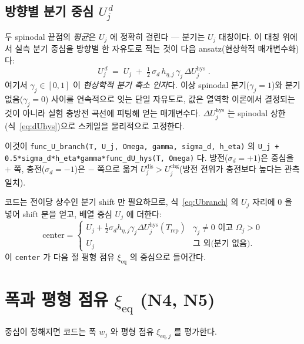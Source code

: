\documentclass[11pt,a4paper]{article}
\newcommand{\eq}{\mathrm{eq}}
\newcommand{\dis}{\mathrm{dis}}
\newcommand{\chg}{\mathrm{chg}}
\newcommand{\hys}{\mathrm{hys}}
\newcommand{\rep}{\mathrm{rep}}
\newcommand{\code}[1]{\texttt{#1}}
\begin{document}
\subsection{방향별 분기 중심 $U_j^{\,d}$}
두 spinodal 끝점의 \emph{평균}은 $U_j$ 에 정확히 걸린다 — 분기는 $U_j$ 대칭이다. 이 대칭 위에서 실측 분기 중심을
방향별 한 자유도로 적는 것이 다음 ansatz(현상학적 매개변수화)다:
\begin{equation}
\boxed{\;U_j^{\,d}\;=\;U_j\;+\;\tfrac12\,\sigma_d\,h_{\eta,j}\,\gamma_j\,\Delta U_j^\hys\;.}
\label{eq:Ubranch}
\end{equation}
여기서 $\gamma_j\in[0,1]$ 이 \emph{현상학적 분기 축소 인자}다. 이상 spinodal 분기($\gamma_j=1$)와 분기 없음($\gamma_j=0$) 사이를 연속적으로 잇는 단일 자유도로, 값은 열역학 이론에서 결정되는 것이 아니라 실험 충방전 곡선에 피팅해 얻는 매개변수다. $\Delta U_j^\hys$ 는 spinodal 상한(식~\eqref{eq:dUhys})으로 스케일을 물리적으로 고정한다.

이것이 \code{func\_U\_branch(T, U\_j, Omega, gamma, sigma\_d, h\_eta)} 의
\code{U\_j + 0.5*sigma\_d*h\_eta*gamma*func\_dU\_hys(T, Omega)} 다. 방전($\sigma_d=+1$)은 중심을 $+$ 쪽,
충전($\sigma_d=-1$)은 $-$ 쪽으로 옮겨 $U_j^{\dis}>U_j^{\chg}$(방전 전위가 충전보다 높다는 관측 일치).

코드는 전이당 상수인 분기 shift 만 필요하므로, 식~\eqref{eq:Ubranch} 의 $U_j$ 자리에 $0$ 을 넣어 shift 분을 얻고,
배열 중심 $U_j$ 에 더한다:
\begin{equation}
\mathrm{center}=
\begin{cases}
U_j+\tfrac12\sigma_d h_{\eta,j}\gamma_j\Delta U_j^\hys(T_\rep) & \gamma_j\ne0 \text{ 이고 } \Omega_j>0\\[2pt]
U_j & \text{그 외(분기 없음)}.
\end{cases}
\label{eq:center}
\end{equation}
이 \code{center} 가 다음 절 평형 점유 $\xi_\eq$ 의 중심으로 들어간다.

\section{폭과 평형 점유 $\xi_\eq$ (N4, N5)}\label{sec:width}
중심이 정해지면 코드는 폭 $w_j$ 와 평형 점유 $\xi_{\eq,j}$ 를 평가한다.
\end{document}
